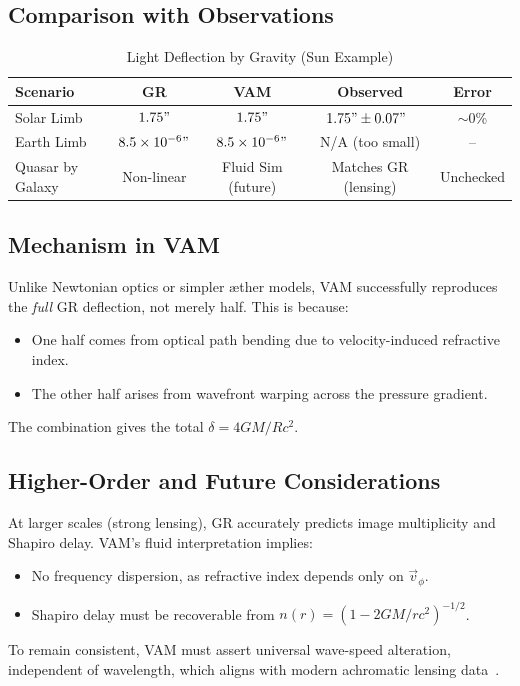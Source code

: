 \documentclass[a4paper, aps,preprint,superscriptaddress, 12pt]{revtex4}
\begin{document}
\subsection*{Comparison with Observations}

\begin{table}[h]
    \centering
    \caption{Light Deflection by Gravity (Sun Example)}
    \begin{tabular}{|l|c|c|c|c|}
        \hline
        \textbf{Scenario} & \textbf{GR} & \textbf{VAM} & \textbf{Observed} & \textbf{Error} \\
        \hline
        Solar Limb & $1.75"$ & $1.75"$ & $1.75" \pm 0.07"$~\cite{shapiro2004gravitational} & $\sim$0\% \\
        Earth Limb & $8.5\times10^{-6}"$ & $8.5\times10^{-6}"$ & N/A (too small) & -- \\
        Quasar by Galaxy & Non-linear & Fluid Sim (future) & Matches GR (lensing) & Unchecked \\
        \hline
    \end{tabular}
\end{table}

\subsection*{Mechanism in VAM}
Unlike Newtonian optics or simpler æther models, VAM successfully reproduces the \textit{full} GR deflection, not merely half. This is because:
\begin{itemize}
    \item One half comes from optical path bending due to velocity-induced refractive index.
    \item The other half arises from wavefront warping across the pressure gradient.
\end{itemize}
The combination gives the total $\delta = 4GM/Rc^2$.

\subsection*{Higher-Order and Future Considerations}
At larger scales (strong lensing), GR accurately predicts image multiplicity and Shapiro delay. VAM's fluid interpretation implies:
\begin{itemize}
    \item No frequency dispersion, as refractive index depends only on $\vec{v}_\phi$.
    \item Shapiro delay must be recoverable from $n(r) = (1 - 2GM/rc^2)^{-1/2}$.
\end{itemize}
To remain consistent, VAM must assert universal wave-speed alteration, independent of wavelength, which aligns with modern achromatic lensing data~\cite{eubanks1997vla, shapiro2004gravitational}.
\end{document}
